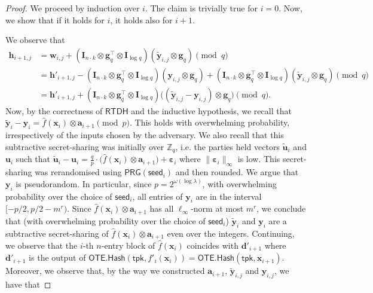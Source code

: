\documentclass{article}
\newcommand{\OTE}{\mathsf{OTE}}
\newcommand{\Z}{\mathbb{Z}}
\renewcommand{\sec}{\ensuremath{\lambda}}
\newcommand{\RTDH}{\mathsf{RTDH}}
\newcommand{\algofont}[1]{\ensuremath{\mathsf{#1}}}
\newcommand{\tpk}{{\algofont{tpk}}}
\newcommand{\Hash}{{\algofont{Hash}}}
\newcommand{\id}{\ensuremath{\mathbf{I}}}
\begin{document}
\begin{proof}
We proceed by induction over $i$. The claim is trivially true for $i=0$. Now, we show that if it holds for $i$, it holds also for $i+1$.

We observe that
\begin{align*}
\mathbf{h}_{i+1,j}
&=\mathbf{w}_{i,j}+(\id_{n\cdot k}\otimes \mathbf g_q^\intercal\otimes \id_{\log q})(\tilde{\mathbf{y}}_{i,j}\otimes \mathbf g_q)\pmod q\\
&=\mathbf{h}'_{i+1,j}
-(\id_{n\cdot k}\otimes \mathbf g_q^\intercal\otimes \id_{\log q})(\mathbf y_{i,j}\otimes \mathbf g_q)
+(\id_{n\cdot k}\otimes \mathbf g_q^\intercal\otimes \id_{\log q})(\tilde{\mathbf{y}}_{i,j}\otimes \mathbf g_q)\pmod q\\
&=\mathbf{h}'_{i+1,j}
+(\id_{n\cdot k}\otimes \mathbf g_q^\intercal\otimes \id_{\log q})\bigl((\tilde{\mathbf{y}}_{i,j}-\mathbf y_{i,j})\otimes \mathbf g_q\bigr)\pmod q.
\end{align*}
Now, by the correctness of $\RTDH$ and the inductive hypothesis, we recall that $ \tilde{\mathbf{y}}_i-\mathbf{y}_i=\hat{f}(\mathbf{x}_i)\otimes \mathbf{a}_{i+1}\pmod p$. {This holds with overwhelming probability, irrespectively of the inputs chosen by the adversary.} We also recall that this subtractive secret-sharing was initially over $\Z_q$, i.e. the parties held vectors $\tilde{\mathbf{u}}_i$ and $\mathbf{u}_i$ such that $\tilde{\mathbf{u}}_i-\mathbf{u}_i=\frac{q}{p}\cdot\bigl(\hat{f}(\mathbf{x}_i)\otimes \mathbf{a}_{i+1}\bigr)+\bm{\varepsilon}_i$ where $\lVert \bm{\varepsilon}_i\rVert_\infty$ is low. This secret-sharing was rerandomised using $\mathsf{PRG}(\mathsf{seed}_i)$ and then rounded. We argue that $\mathbf{y}_i$ is pseudorandom. {In particular, since $p=2^{\omega(\log \sec)}$, with overwhelming probability over the choice of $\mathsf{seed}_i$, all entries of $\mathbf{y}_i$ are in the interval $[-p/2, p/2-m^r)$. Since $\hat{f}(\mathbf{x}_i)\otimes \mathbf{a}_{i+1}$ has all $\ell_\infty$-norm at most $m^{r}$, we conclude that (with overwhelming probability over the choice of $\mathsf{seed}_i$)} $\tilde{\mathbf{y}}_i$ and $\mathbf{y}_i$ are a subtractive secret-sharing of $\hat{f}(\mathbf{x}_i)\otimes \mathbf{a}_{i+1}$ even over the integers. Continuing, we observe that the $i$-th $n$-entry block of $\hat{f}(\mathbf{x}_i)$ coincides with $\mathbf{d}'_{i+1}$ where $\mathbf{d}'_{i+1}$ is the output of $\OTE.\Hash(\tpk, f'_i(\mathbf{x}_i))=\OTE.\Hash(\tpk, \mathbf{x}_{i+1})$. Moreover, we observe that, by the way we constructed $\mathbf{a}_{i+1}$, $\tilde{\mathbf{y}}_{i, j}$ and $\mathbf{y}_{i, j}$, we have that 

\end{proof}
\end{document}
